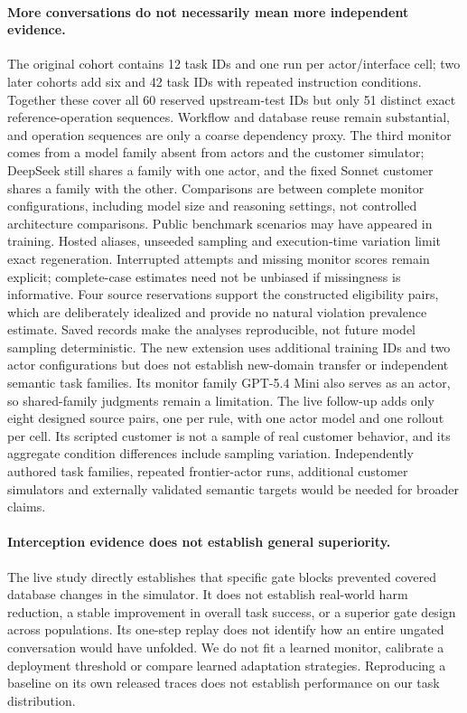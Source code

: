 \documentclass[10pt]{article}
\begin{document}
\paragraph{More conversations do not necessarily mean more independent evidence.}
The original cohort contains 12 task IDs and one run per actor/interface cell; two later cohorts add six and 42 task IDs with repeated instruction conditions. Together these cover all 60 reserved upstream-test IDs but only 51 distinct exact reference-operation sequences. Workflow and database reuse remain substantial, and operation sequences are only a coarse dependency proxy. The third monitor comes from a model family absent from actors and the customer simulator; DeepSeek still shares a family with one actor, and the fixed Sonnet customer shares a family with the other. Comparisons are between complete monitor configurations, including model size and reasoning settings, not controlled architecture comparisons. Public benchmark scenarios may have appeared in training. Hosted aliases, unseeded sampling and execution-time variation limit exact regeneration. Interrupted attempts and missing monitor scores remain explicit; complete-case estimates need not be unbiased if missingness is informative. Four source reservations support the constructed eligibility pairs, which are deliberately idealized and provide no natural violation prevalence estimate. Saved records make the analyses reproducible, not future model sampling deterministic. The new extension uses additional training IDs and two actor configurations but does not establish new-domain transfer or independent semantic task families. Its monitor family GPT-5.4 Mini also serves as an actor, so shared-family judgments remain a limitation. The live follow-up adds only eight designed source pairs, one per rule, with one actor model and one rollout per cell. Its scripted customer is not a sample of real customer behavior, and its aggregate condition differences include sampling variation. Independently authored task families, repeated frontier-actor runs, additional customer simulators and externally validated semantic targets would be needed for broader claims.

\paragraph{Interception evidence does not establish general superiority.}
The live study directly establishes that specific gate blocks prevented covered database changes in the simulator. It does not establish real-world harm reduction, a stable improvement in overall task success, or a superior gate design across populations. Its one-step replay does not identify how an entire ungated conversation would have unfolded. We do not fit a learned monitor, calibrate a deployment threshold or compare learned adaptation strategies. Reproducing a baseline on its own released traces does not establish performance on our task distribution.
\end{document}
